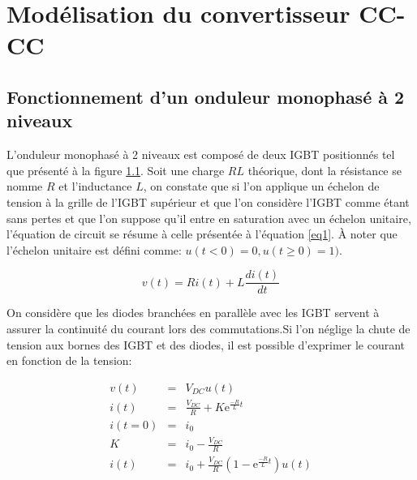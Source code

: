 \documentclass[11pt,letterpaper,final]{report}
\begin{document}
\chapter{Modélisation du convertisseur CC-CC}
\section{Fonctionnement d'un onduleur monophasé à 2 niveaux}
L'onduleur monophasé à 2 niveaux est composé de deux IGBT positionnés tel que présenté à la figure \ref{}. Soit une charge $RL$ théorique, dont la résistance se nomme $R$ et l'inductance $L$, on constate que si l'on applique un échelon de tension à la grille de l'IGBT supérieur et que l'on considère l'IGBT comme étant sans pertes et que l'on suppose qu'il entre en saturation avec un échelon unitaire, l'équation de circuit se résume à celle présentée à l'équation \ref{eq1}. À noter que l'échelon unitaire est défini comme: $u(t<0) = 0, u(t\geq 0) = 1)$.

\begin{equation}
\label{eq1}
v(t) = R i(t) + L \frac{d i(t)}{dt}
\end{equation}

On considère que les diodes branchées en parallèle avec les IGBT servent à assurer la continuité du courant lors des commutations.Si l'on néglige la chute de tension aux bornes des IGBT et des diodes, il est possible d'exprimer le courant en fonction de la tension:

\begin{eqnarray}
v(t) &=& V_{DC} u(t)\\
i(t) &=& \frac{V_{DC}}{R} + K \mbox{e}^{\frac{-R}{L}t}\\
i(t=0) &=& i_0\\
K &=& i_0 - \frac{V_{DC}}{R} \\
i(t) &=& i_0  + \frac{V_{DC}}{R}\left(1 - \mbox{e}^{\frac{-R}{L}t}\right)u(t)
\end{eqnarray}
\end{document}
